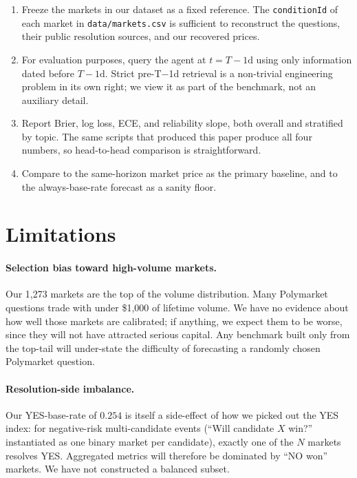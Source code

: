 \documentclass{article}
\begin{document}
\begin{enumerate}
\item Freeze the markets in our dataset as a fixed reference. The
      \texttt{conditionId} of each market in
      \texttt{data/markets.csv} is sufficient to reconstruct the
      questions, their public resolution sources, and our recovered
      prices.
\item For evaluation purposes, query the agent at $t = T - 1\text{d}$
      using only information dated before $T-1\text{d}$. Strict
      pre-T$-$1d retrieval is a non-trivial engineering problem in
      its own right; we view it as part of the benchmark, not an
      auxiliary detail.
\item Report Brier, log loss, ECE, and reliability slope, both
      overall and stratified by topic. The same scripts that
      produced this paper produce all four numbers, so head-to-head
      comparison is straightforward.
\item Compare to the same-horizon market price as the primary
      baseline, and to the always-base-rate forecast as a sanity
      floor.
\end{enumerate}

\section{Limitations}
\label{sec:limits}

\paragraph{Selection bias toward high-volume markets.}
Our 1{,}273 markets are the top of the volume distribution. Many
Polymarket questions trade with under \$1{,}000 of lifetime volume.
We have no evidence about how well those markets are calibrated; if
anything, we expect them to be worse, since they will not have
attracted serious capital. Any benchmark built only from the top-tail
will under-state the difficulty of forecasting a randomly chosen
Polymarket question.

\paragraph{Resolution-side imbalance.}
Our YES-base-rate of $0.254$ is itself a side-effect of how we picked
out the YES index: for negative-risk multi-candidate events
(``Will candidate $X$ win?'' instantiated as one binary market per
candidate), exactly one of the $N$ markets resolves YES. Aggregated
metrics will therefore be dominated by ``NO won'' markets. We have
not constructed a balanced subset.
\end{document}
